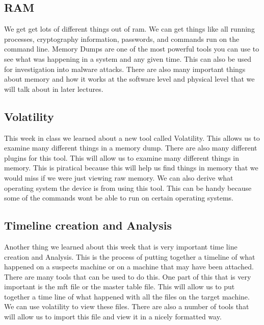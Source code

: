 \documentclass[letterpaper, onecolumn,10pt]{IEEEtran}
\begin{document}
            \subsection{RAM} We get get lots of different things out of ram. We can get things like all running processes, cryptography information, passwords, and commands run on the command line. Memory Dumps are one of the most powerful tools you can use to see what was happening in a system and any given time. This can also be used for investigation into malware attacks. There are also many important things about memory and how it works at the software level and physical level that we will talk about in later lectures.\\
            
            \subsection{Volatility} This week in class we learned about a new tool called Volatility. This allows us to examine many different things in a memory dump. There are also many different plugins for this tool. This will allow us to examine many different things in memory. This is piratical because this will help us find things in memory that we would miss if we were just viewing raw memory. We can also derive what operating system the device is from using this tool. This can be handy because some of the commands wont be able to run on certain operating systems.\\
            
            \subsection{Timeline creation and Analysis} Another thing we learned about this week that is very important time line creation and Analysis. This is the process of putting together a timeline of what happened on a suspects machine or on a machine that may have been attached. There are many tools that can be used to do this. One part of this that is very important is the mft file or the master table file. This will allow us to put together a time line of what happened with all the files on the target machine. We can use volatility to view these files. There are also a number of tools that will allow us to import this file and view it in a nicely formatted way.\\
            
\end{document}
